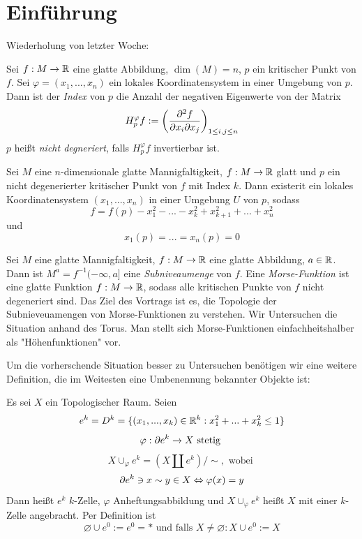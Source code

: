 \section{Einführung}

Wiederholung von letzter Woche:

\begin{definition}
    Sei $f: M \to \R$ eine glatte Abbildung, $\dim(M) = n$, $p$ ein kritischer 
    Punkt von $f$. Sei $\varphi = (x_1, ..., x_n)$ ein lokales Koordinatensystem 
    in einer Umgebung von $p$. Dann ist der \textit{Index} von $p$ die Anzahl 
    der negativen Eigenwerte von der Matrix
    \[ H_p^{\varphi}f := \left( \pdderive[f]{x_i}{x_j} \right)_{1 \leq i, j \leq n} \]
    $p$ heißt \textit{nicht degneriert}, falls  $H_p^{\varphi}f$ invertierbar ist.
\end{definition}

\begin{theorem}
    Sei $M$ eine $n$-dimensionale glatte Mannigfaltigkeit, $f: M \to \R$ glatt 
    und $p$ ein nicht degenerierter kritischer Punkt von $f$ mit Index $k$. Dann 
    existerit ein lokales Koordinatensystem $(x_1, ..., x_n)$ in einer Umgebung
    $U$ von $p$, sodass
    \[ f = f(p) - x_1^2 - ... - x_k^2 + x_{k + 1}^2 + ... + x_n^2 \]
    und 
    \[ x_1(p) = ... = x_n (p) = 0 \]
\end{theorem}
\sectiondone

Sei $M$ eine glatte Mannigfaltigkeit, $f: M \to \R$ eine glatte Abbildung, 
$a \in \R$. Dann ist $M^a = f^{-1}(- \infty, a]$ eine \textit{Subniveaumenge} 
von $f$. Eine \textit{Morse-Funktion} ist eine glatte Funktion $f: M \to \R$, 
sodass alle kritischen Punkte von $f$ nicht degeneriert sind.
Das Ziel des Vortrags ist es, die Topologie der Subnieveuamengen von 
Morse-Funktionen zu verstehen. Wir Untersuchen die Situation anhand des Torus. 
Man stellt sich Morse-Funktionen einfachheitshalber als "Höhenfunktionen" vor.

Um die vorherschende Situation besser zu Untersuchen benötigen wir eine weitere
Definition, die im Weitesten eine Umbenennung bekannter Objekte ist:

\begin{definition}
    Es sei $X$ ein Topologischer Raum. Seien
    \[ e^k = D^k = \{(x_1, ..., x_k) \in \R^k: x_1^2 + ... + x_k^2 \leq 1\} \]
    \[ \varphi: \del e^k \rightarrow X \text{ stetig } \]
    \[ X \cup_{\varphi} e^k = (X \amalg e^k) / \sim, \text{ wobei } \]
    \[ \del e^k \ni x \sim y \in X \Leftrightarrow \varphi(x) = y \]
    Dann heißt $e^k$ $k$-Zelle, $\varphi$ Anheftungsabbildung 
    und $X \cup_{\varphi} e^k$ heißt $X$ mit einer $k$-Zelle 
    angebracht.
    Per Definition ist 
    \[ \varnothing \cup e^0 := e^0 = \ast \text{ und falls } X \neq \varnothing : X \cup e^0 := X \]
\end{definition}


